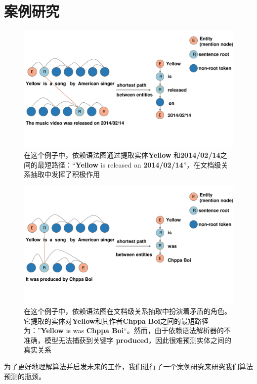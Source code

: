 \documentclass[bachelor]{thesis-uestc}
\begin{document}
\section{案例研究}
\begin{figure}[t]
    \includegraphics[width=\linewidth]{misc/case1.pdf}
    \caption{ 在这个例子中，依赖语法图通过提取实体\textbf{Yellow} 和\textbf{2014/02/14}之间的最短路径：“\textbf{Yellow} is released on \textbf{2014/02/14}”，在文档级关系抽取中发挥了积极作用
    } 
\end{figure}\label{fig_casea}
\begin{figure}[t]
    \includegraphics[width=\linewidth]{misc/case2.pdf}
    \caption{在这个例子中，依赖语法图在文档级关系抽取中扮演着矛盾的角色。它提取的实体对\textbf{Yellow}和其作者\textbf{Chppa Boi}之间的最短路径为：”\textbf{Yellow} is was \textbf{Chppa Boi}“。然而，由于依赖语法解析器的不准确，模型无法捕获到关键字 \textbf{produced}，因此很难预测实体之间的真实关系}
\end{figure}\label{fig_caseb}

为了更好地理解算法并启发未来的工作，我们进行了一个案例研究来研究我们算法预测的瓶颈。\par
\end{document}
